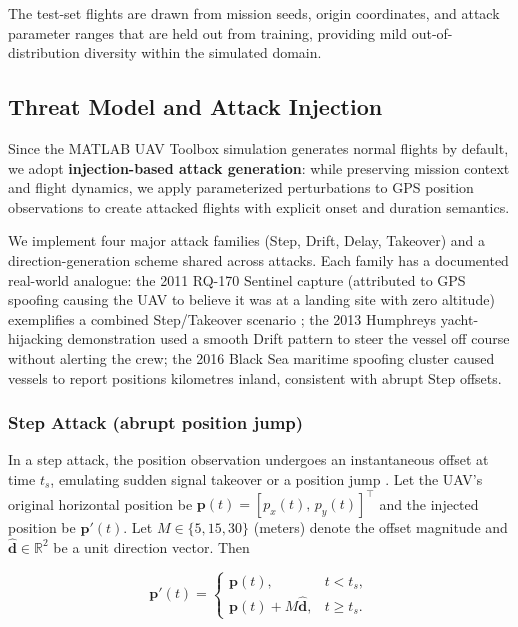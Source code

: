 \documentclass{ieeeaccess}
\begin{document}
The test-set flights are drawn from mission seeds, origin coordinates, and attack
parameter ranges that are held out from training, providing mild out-of-distribution
diversity within the simulated domain.

\subsection{Threat Model and Attack Injection}
\label{sec:threat_model}

Since the MATLAB UAV Toolbox simulation generates normal flights by default, we adopt \textbf{injection-based attack generation}: while preserving mission context and flight dynamics, we apply parameterized perturbations to GPS position observations to create attacked flights with explicit onset and duration semantics.

We implement four major attack families (Step, Drift, Delay, Takeover) and a direction-generation scheme shared across attacks.
Each family has a documented real-world analogue: the 2011 RQ-170 Sentinel capture
(attributed to GPS spoofing causing the UAV to believe it was at a landing site with
zero altitude) exemplifies a combined Step/Takeover scenario \cite{ref24};
the 2013 Humphreys yacht-hijacking demonstration \cite{ref49} used a smooth Drift
pattern to steer the vessel off course without alerting the crew;
the 2016 Black Sea maritime spoofing cluster \cite{ref50} caused vessels to report
positions kilometres inland, consistent with abrupt Step offsets.

\subsubsection{Step Attack (abrupt position jump)}

In a step attack, the position observation undergoes an instantaneous offset at time $t_s$, emulating sudden signal takeover or a position jump \cite{ref24}. Let the UAV's original horizontal position be $\mathbf{p}(t)=[p_x(t),\,p_y(t)]^\top$ and the injected position be $\mathbf{p}'(t)$. Let $M\in\{5,15,30\}$ (meters) denote the offset magnitude and $\hat{\mathbf{d}}\in\mathbb{R}^2$ be a unit direction vector. Then

\begin{equation}
\mathbf{p}'(t)=
\begin{cases}
\mathbf{p}(t), & t<t_s,\\
\mathbf{p}(t)+M\hat{\mathbf{d}}, & t\ge t_s.
\end{cases}
\end{equation}
\end{document}
